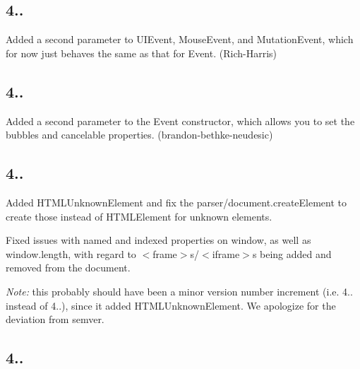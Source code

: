 \subsection*{4..}


\begin{DoxyItemize}
\item Added a second parameter to {\ttfamily U\+I\+Event}, {\ttfamily Mouse\+Event}, and {\ttfamily Mutation\+Event}, which for now just behaves the same as that for {\ttfamily Event}. (Rich-\/\+Harris)
\end{DoxyItemize}

\subsection*{4..}


\begin{DoxyItemize}
\item Added a second parameter to the {\ttfamily Event} constructor, which allows you to set the {\ttfamily bubbles} and {\ttfamily cancelable} properties. (brandon-\/bethke-\/neudesic)
\end{DoxyItemize}

\subsection*{4..}


\begin{DoxyItemize}
\item Added {\ttfamily H\+T\+M\+L\+Unknown\+Element} and fix the parser/{\ttfamily document.\+create\+Element} to create those instead of {\ttfamily H\+T\+M\+L\+Element} for unknown elements.
\item Fixed issues with named and indexed properties on {\ttfamily window}, as well as {\ttfamily window.\+length}, with regard to {\ttfamily $<$frame$>$}s/{\ttfamily $<$iframe$>$}s being added and removed from the document.
\end{DoxyItemize}

{\itshape Note\+:} this probably should have been a minor version number increment (i.\+e. 4.. instead of 4..), since it added {\ttfamily H\+T\+M\+L\+Unknown\+Element}. We apologize for the deviation from semver.

\subsection*{4..}



